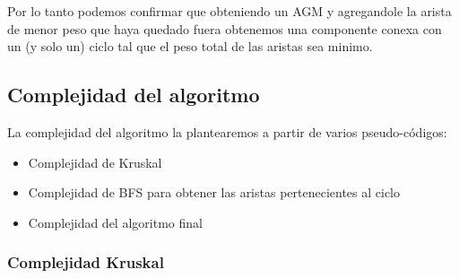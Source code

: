 Por lo tanto podemos confirmar que obteniendo un AGM y agregandole la arista de menor peso que haya quedado fuera obtenemos una componente conexa con un (y solo un) ciclo tal que el peso total de las aristas sea minimo.


\newpage


\subsection{Complejidad del algoritmo}

La complejidad del algoritmo la plantearemos a partir de varios pseudo-códigos:

\begin{itemize}
\item Complejidad de Kruskal
\item Complejidad de BFS para obtener las aristas pertenecientes al ciclo
\item Complejidad del algoritmo final
\end{itemize}

\subsubsection{Complejidad Kruskal}


